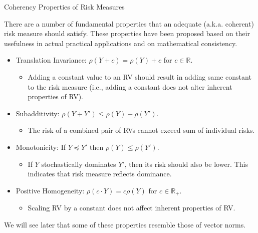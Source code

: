 \documentclass[handout,9pt]{beamer}
\begin{document}
%
\begin{frame}{Coherency Properties of Risk Measures}

There are a number of fundamental properties that an adequate (a.k.a. coherent) risk measure should satisfy. These properties have been proposed based on their usefulness in actual practical applications and on mathematical consistency. 
\begin{block}{}
\begin{itemize}
\setlength{\itemsep}{10pt}
\item Translation Invariance: $\rho(Y+c)=\rho(Y)+c$ for $c\in \mathbb{R}$. 
\begin{itemize}
\item Adding a constant value to an RV should result in adding same constant to the risk measure (i.e., adding a constant does not alter inherent properties of RV).
\end{itemize}
\item Subadditivity: $\rho(Y+Y')\leq \rho(Y)+\rho(Y')$. 
\begin{itemize}
\item The risk of a combined pair of RVs cannot exceed sum of individual risks. 
\end{itemize}
\item Monotonicity:  If $Y\preceq Y'$ then $\rho(Y)\leq \rho(Y')$. 
\begin{itemize}
\item If $Y$ stochastically dominates $Y'$, then its risk should also be lower. This indicates that risk measure reflects dominance. 
\end{itemize}
\item Positive Homogeneity: $\rho(c\cdot Y)=c\rho(Y)$ for $c\in \mathbb{R}_+$. 
\begin{itemize}
\item Scaling RV by a constant does not affect inherent properties of RV.
\end{itemize}
\end{itemize}
\end{block}
We will see later that some of these properties resemble those of vector norms. 

\end{frame}
\end{document}
